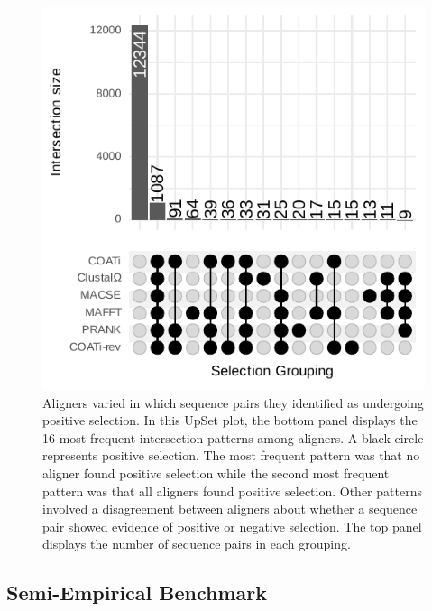\documentclass[12pt,letterpaper]{article}
\begin{document}
\begin{figure}[h!]
    \centering%
    \includegraphics{figures/fig-sel-empirical.pdf}
    \par
    \caption{Aligners varied in which sequence pairs they identified as undergoing positive selection.
    In this UpSet plot, the bottom panel displays the 16 most frequent intersection patterns among aligners. A black circle represents positive selection. The most frequent pattern was that no aligner found positive selection while the second most frequent pattern was that all aligners found positive selection. Other patterns involved a disagreement between aligners about whether a sequence pair showed evidence of positive or negative selection. The top panel displays the number of sequence pairs in each grouping.
%
    \label{fig:sel-empirical}}
\end{figure}

\subsection*{Semi-Empirical Benchmark}
\end{document}
